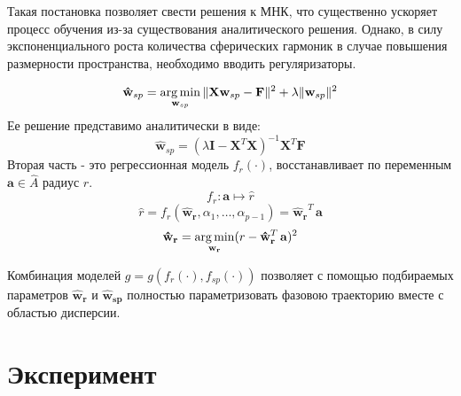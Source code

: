 \documentclass[12pt,twoside]{article}
\begin{document}
Такая постановка позволяет свести решения к МНК, что существенно ускоряет процесс обучения из-за существования аналитического решения.
Однако, в силу экспоненциального роста количества сферических гармоник в случае повышения размерности пространства, необходимо вводить регуляризаторы. 

\begin{equation}
    \mathbf{\hat{w}}_{sp} = \argmin_{\mathbf{w}_{sp}}
    \|\mathbf{X}\mathbf{w}_{sp} - \mathbf{F}\|^2 + \lambda\|\mathbf{w}_{sp}\|^2
\label{eq:arg_l2}
\end{equation}
Ее решение представимо аналитически в виде:
\begin{equation}
    \mathbf{\hat{w}}_{sp} = (\lambda \mathbf{I} - \mathbf{X}^T\mathbf{X})^{-1}\mathbf{X}^T\mathbf{F}
\label{eq:arg_l2_solution}
\end{equation}
Вторая часть - это регрессионная модель $f_r(\cdot)$, восстанавливает по переменным $\mathbf{a} \in \hat{A}$ радиус $r$.
\begin{equation}
    f_r: \mathbf{a}
    \mapsto
    \hat{r}
\label{eq:arg_l}
\end{equation}
\[
\hat{r} = f_r(\mathbf{\hat{w}_r},\alpha_{1},\dots, \alpha_{p-1}) = \mathbf{\hat{w}_r}^T\,\mathbf{a}
\]
\[
\mathbf{\hat{w}_r} = \argmin_{\mathbf{w_r}}(r - \mathbf{\hat{w}_r}^T\,\mathbf{a})^2
\]

Комбинация моделей  $ g = g(f_r(\cdot),f_{sp}(\cdot))$ позволяет с помощью подбираемых параметров $\mathbf{\hat{w}_r}$ и $\mathbf{\hat{w}_{sp}}$ полностью параметризовать фазовою траекторию вместе с областью дисперсии.


\section{Эксперимент}
\end{document}
